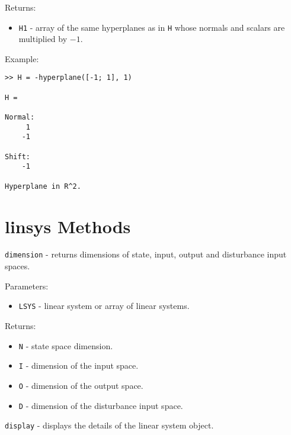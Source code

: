 Returns:
\begin{itemize}
\item {\tt H1} - array of the same hyperplanes as in {\tt H} whose normals and
scalars are multiplied by $-1$.
\end{itemize}

Example:
{\tt \begin{verbatim}
>> H = -hyperplane([-1; 1], 1)

H =

Normal:
     1
    -1

Shift:
    -1

Hyperplane in R^2.
\end{verbatim} }
















\newpage

















\section{linsys Methods}
{\Large {\tt dimension}} - returns dimensions of state, input, output and
disturbance input spaces.

Parameters:
\begin{itemize}
\item {\tt LSYS} - linear system or array of linear systems.
\end{itemize}

Returns:
\begin{itemize}
\item {\tt N} - state space dimension.
\item {\tt I} - dimension of the input space.
\item {\tt O} - dimension of the output space.
\item {\tt D} - dimension of the disturbance input space.
\end{itemize}

\newpage

{\Large {\tt display}} - displays the details of the linear system object.

